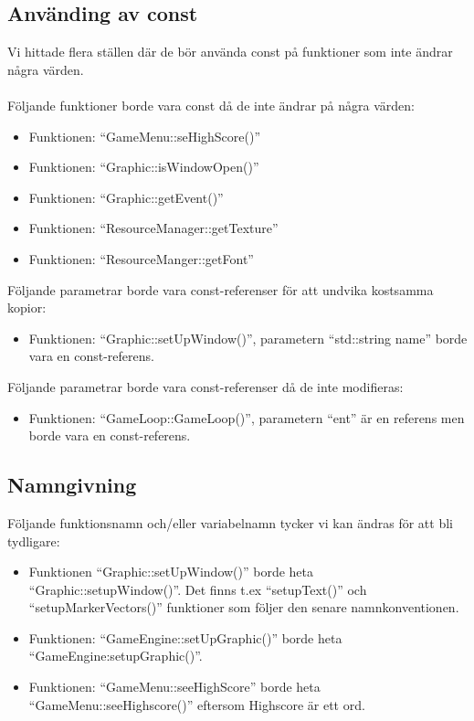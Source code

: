 \documentclass{TDP003mall}
\begin{document}
\subsection{Använding av const}
Vi hittade flera ställen där de bör använda const på funktioner som inte ändrar några värden.
\\\\
Följande funktioner borde vara const då de inte ändrar på några värden: 
\begin{itemize}
\item Funktionen: ``GameMenu::seHighScore()''
\item Funktionen: ``Graphic::isWindowOpen()''
\item Funktionen: ``Graphic::getEvent()''
\item Funktionen: ``ResourceManager::getTexture''
\item Funktionen: ``ResourceManger::getFont''
\end{itemize}
Följande parametrar borde vara const-referenser för att undvika kostsamma kopior:
\begin{itemize}
\item Funktionen: ``Graphic::setUpWindow()'', parametern ``std::string name'' borde vara en const-referens.
\end{itemize}
Följande parametrar borde vara const-referenser då de inte modifieras:
\begin{itemize}
\item Funktionen: ``GameLoop::GameLoop()'', parametern ``ent'' är en referens men borde vara en const-referens.
\end{itemize}
\subsection{Namngivning}
Följande funktionsnamn och/eller variabelnamn tycker vi kan ändras för att bli tydligare:
\begin{itemize}
\item Funktionen ``Graphic::setUpWindow()'' borde heta ``Graphic::setupWindow()''. Det finns t.ex ``setupText()'' och ``setupMarkerVectors()'' funktioner som följer den senare namnkonventionen.
\item Funktionen: ``GameEngine::setUpGraphic()'' borde heta ``GameEngine:setupGraphic()''.
\item Funktionen: ``GameMenu::seeHighScore'' borde heta ``GameMenu::seeHighscore()'' eftersom Highscore är ett ord.
\end{itemize}
\end{document}
